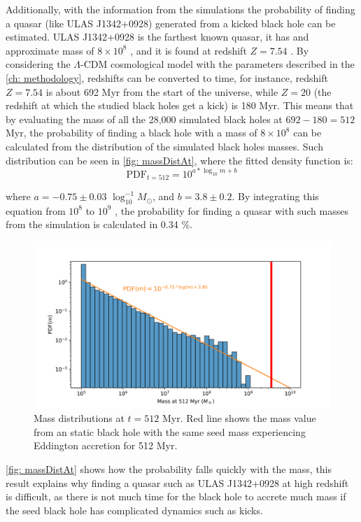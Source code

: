 	Additionally, with the information from the simulations the probability of finding a quasar (like ULAS J1342+0928) generated from a kicked black hole can be estimated. ULAS J1342+0928 is the farthest known quasar, it has and approximate mass of $8\times10^8$ \sm, and it is found at redshift $Z = 7.54$ \cite{banados2018800, paris2018sloan}. By considering the $\Lambda$-CDM cosmological model with the parameters described in the \autoref{ch: methodology}, redshifts can be converted to time, for instance, redshift $Z = 7.54$ is about 692 Myr from the start of the universe, while $Z = 20$ (the redshift at which the studied black holes get a kick) is 180 Myr. This means that by evaluating the mass of all the 28,000 simulated black holes at $692 - 180 = 512$ Myr, the probability of finding a black hole with a mass of $8\times10^8$ \sm can be calculated from the distribution of the simulated black holes masses. Such distribution can be seen in \autoref{fig: massDistAt}, where the fitted density function is:
	\begin{equation}
		\text{PDF}_{t = 512} = 10 ^ {a * \log_{10}m + b}
	\end{equation}
	
	where $a = -0.75 \pm 0.03$ $\log_{10}^{-1}M_\odot$, and $b = 3.8 \pm 0.2$. By integrating this equation from $10^8$ to $10^9$ \sm, the probability for finding a quasar with such masses from the simulation is calculated in 0.34 \%.
	\begin{figure}[h]
		\centering
		\includegraphics[width=0.8\linewidth]{"../Files/Week 14/masses_at"}
		\caption{Mass distributions at $t = 512$ Myr. Red line shows the mass value from an static black hole with the same seed mass experiencing Eddington accretion for 512 Myr.}
		\label{fig: massDistAt}
	\end{figure}

	\autoref{fig: massDistAt} shows how the probability falls quickly with the mass, this result explains why finding a quasar such as ULAS J1342+0928 at high redshift is difficult, as there is not much time for the black hole to accrete much mass if the seed black hole has complicated dynamics such as kicks.
	
